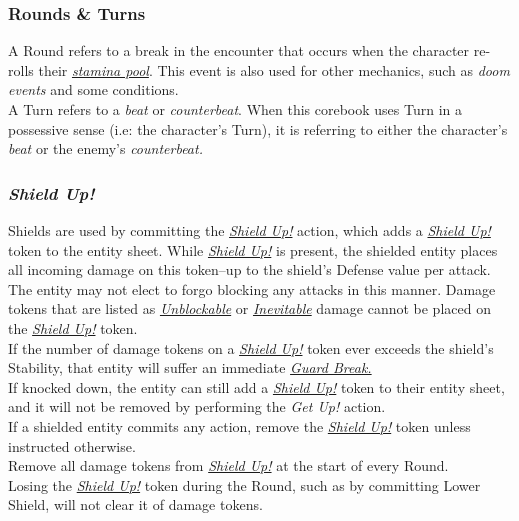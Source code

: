 \documentclass[12pt]{article}
\newcommand{\reftoit}[1]{\hyperlink{#1}{\emph{#1}}}
\begin{document}
\begin{multicols*}{2}
\subsubsection{Rounds \& Turns}
A Round refers to a break in the encounter that occurs when the character re-rolls their \reftoit{stamina pool}. This event is also used for other mechanics, such as \emph{doom events} and some conditions.\\
A Turn refers to a \emph{beat} or \emph{counterbeat}. When this corebook uses Turn in a possessive sense (i.e: the character’s Turn), it is referring to either the character’s \emph{beat} or the enemy’s \emph{counterbeat.}

\subsubsection{\emph{Shield Up!}}
\hypertarget{Shield Up!}{}
Shields are used by committing the \reftoit{Shield Up!} action, which adds a \reftoit{Shield Up!} token to the entity sheet. While \reftoit{Shield Up!} is present, the shielded entity places all incoming damage on this token--up to the shield’s Defense value per attack. The entity may not elect to forgo blocking any attacks in this manner. Damage tokens that are listed as \reftoit{Unblockable} or \reftoit{Inevitable} damage cannot be placed on the \reftoit{Shield Up!} token.\\
If the number of damage tokens on a \reftoit{Shield Up!} token ever exceeds the shield’s Stability, that entity will suffer an immediate \reftoit{Guard Break.}\\
If knocked down, the entity can still add a \reftoit{Shield Up!} token to their entity sheet, and it will not be removed by performing the \emph{Get Up!} action.\\
If a shielded entity commits any action, remove the \reftoit{Shield Up!} token unless instructed otherwise.\\
Remove all damage tokens from \reftoit{Shield Up!} at the start of every Round.\\
Losing the \reftoit{Shield Up!} token during the Round, such as by committing Lower Shield, will not clear it of damage tokens.


\end{multicols*}
\end{document}
